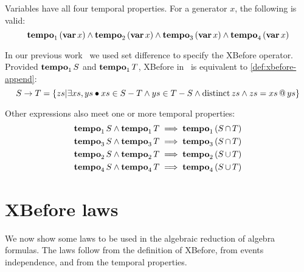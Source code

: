 \documentclass[en,twoside,onehalfspacing,phd]{risethesis}
\makeatletter
\def\varop{\ensuremath\operatorname{\mathbf{var}}}
\newcommand{\var}[1]{\ensuremath\varop #1}
\def\xbeforeop{\ensuremath\rightarrow}
\newcommand{\xbefore}[2]{\ensuremath #1 \xbeforeop #2 }
\def\tempoop{\ensuremath\operatorname{\mathbf{tempo}}}
\newcommand{\tempo}[2][1-4]{\ensuremath\tempoop_{#1} #2}
\def\distinctop{\ensuremath\operatorname{distinct}}
\newcommand{\distinct}[1]{\ensuremath\distinctop #1}
\newcommand{\append}[2]{\ensuremath #1 \operatorname{\mathbf{@}} #2}
\newcommand{\parsin}[1]{\ensuremath\left( #1 \right)}
\def\union{\ensuremath\operatorname{\cup}}
\def\inter{\ensuremath\operatorname{\cap}}
\makeatother
\begin{document}
Variables have all four temporal properties. For a generator $x$, the following is valid:
%
\[
\tempo[1]{\left(\var{x}\right)} \land
\tempo[2]{\left(\var{x}\right)} \land
\tempo[3]{\left(\var{x}\right)} \land
\tempo[4]{\left(\var{x}\right)}
\]

\begin{sloppypar}
In our previous work~\cite{DM2015} we used set difference to specify the XBefore operator.
Provided $\tempo[1]{S}$ and $\tempo[1]{T}$, XBefore in~\cite{DM2015} is equivalent to \eqref{def:xbefore-append}:
%
\begin{equation}
\xbefore{S}{T} = \left\{ zs | \exists xs, ys \bullet xs \in S-T \land ys \in T-S \land \distinct{zs} \land zs = \append{xs}{ys}  \right\}
\end{equation}
\end{sloppypar}

Other expressions also meet one or more temporal properties:
\begin{subequations}
\begin{align}
\tempo[1]{S} \land \tempo[1]{T} & \implies \tempo[1]{\parsin{S \inter T}}\\
\tempo[3]{S} \land \tempo[3]{T} & \implies \tempo[3]{\parsin{S \inter T}}\\
\tempo[2]{S} \land \tempo[2]{T} & \implies \tempo[2]{\parsin{S \union T}}\\
\tempo[4]{S} \land \tempo[4]{T} & \implies \tempo[4]{\parsin{S \union T}}
\end{align}
\end{subequations}

\section{XBefore laws}
\label{sec:xbefore-laws}

We now show some laws to be used in the algebraic reduction of \ac{algebra} formulas.
The laws follow from the definition of XBefore, from events independence, and from the temporal properties.
\end{document}
